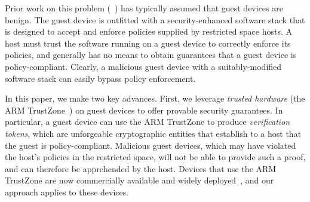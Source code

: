 Prior work on this problem
(\eg~\cite{asm:sec14,flaskdroid:sec13,conxsense:asiaccs14,worlddriven:ccs14,blindspot:2009,markit:upside14})
has typically assumed that guest devices are benign. The guest device is
outfitted with a security-enhanced software stack that is designed to accept
and enforce policies supplied by restricted space hosts. A host must trust the
software running on a guest device to correctly enforce its policies, and
generally has no means to obtain guarantees that a guest device is
policy-compliant. Clearly, a malicious guest device with a suitably-modified
software stack can easily bypass policy enforcement.

In this paper, we make two key advances. First, we leverage \textit{trusted
hardware} (the ARM TrustZone~\cite{armtz}) on guest devices to offer provable
security guarantees. In particular, a guest device can use the ARM TrustZone to
produce \textit{verification tokens}, which are unforgeable cryptographic
entities that establish to a host that the guest is policy-compliant.
Malicious guest devices, which may have violated the host's policies in the
restricted space, will not be able to provide such a proof, and can therefore
be apprehended by the host. Devices that use the ARM TrustZone are now
commercially available and widely deployed~\cite{knox:ccs14}, and our approach
applies to these devices.


